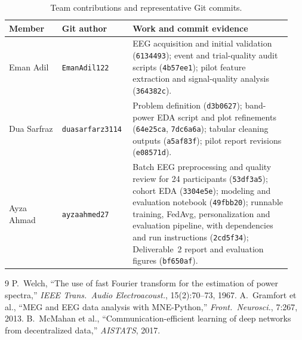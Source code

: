 \documentclass[11pt,a4paper]{article}
\begin{document}
\begin{table}[H]
\centering
\caption{Team contributions and representative Git commits.}
\label{tab:team-contributions}
\small
\begin{tabular}{@{}p{0.18\linewidth}p{0.22\linewidth}p{0.54\linewidth}@{}}
\toprule
Member & Git author & Work and commit evidence \\
\midrule
Eman Adil & \texttt{EmanAdil122} &
EEG acquisition and initial validation (\texttt{6134493}); event and
trial-quality audit scripts (\texttt{4b57ee1}); pilot feature extraction
and signal-quality analysis (\texttt{364382c}). \\[3pt]
Dua Sarfraz & \texttt{duasarfarz3114} &
Problem definition (\texttt{d3b0627}); band-power EDA script and plot
refinements (\texttt{64e25ca}, \texttt{7dc6a6a}); tabular cleaning
outputs (\texttt{a5af83f}); pilot report revisions (\texttt{e08571d}). \\[3pt]
Ayza Ahmad & \texttt{ayzaahmed27} &
Batch EEG preprocessing and quality review for 24 participants
(\texttt{53df3a5}); cohort EDA (\texttt{3304e5e}); modeling and
evaluation notebook (\texttt{49fbb20}); runnable training, FedAvg,
personalization and evaluation pipeline, with dependencies and run
instructions (\texttt{2cd5f34}); Deliverable~2 report and evaluation
figures (\texttt{bf650af}). \\
\bottomrule
\end{tabular}
\end{table}

\begin{thebibliography}{9}
 P.~Welch, ``The use of fast Fourier transform for the estimation of power spectra,'' \emph{IEEE Trans.\ Audio Electroacoust.}, 15(2):70--73, 1967.
 A.~Gramfort et al., ``MEG and EEG data analysis with MNE-Python,'' \emph{Front.\ Neurosci.}, 7:267, 2013.
 B.~McMahan et al., ``Communication-efficient learning of deep networks from decentralized data,'' \emph{AISTATS}, 2017.
\end{thebibliography}
\end{document}
